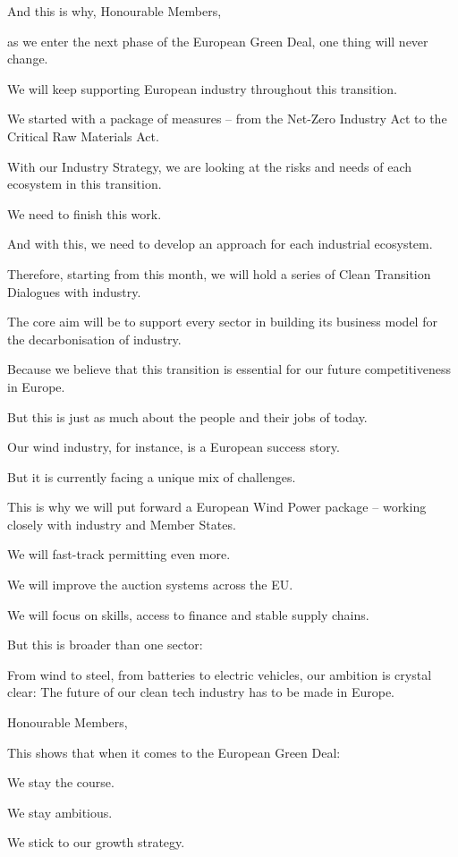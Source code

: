 \documentclass[a4paper,11pt]{article}
\begin{document}
And this is why, Honourable Members,

as we enter the next phase of the European Green Deal, one thing will never change.

We will keep supporting European industry throughout this transition.  

We started with a package of measures – from the Net-Zero Industry Act to the Critical Raw Materials Act. 

With our Industry Strategy, we are looking at the risks and needs of each ecosystem in this transition.

We need to finish this work.

And with this, we need to develop an approach for each industrial ecosystem.

Therefore, starting from this month, we will hold a series of Clean Transition Dialogues with industry.

The core aim will be to support every sector in building its business model for the decarbonisation of industry.

Because we believe that this transition is essential for our future competitiveness in Europe.

But this is just as much about the people and their jobs of today.

Our wind industry, for instance, is a European success story.

But it is currently facing a unique mix of challenges.

This is why we will put forward a European Wind Power package – working closely with industry and Member States.

We will fast-track permitting even more.

We will improve the auction systems across the EU.

We will focus on skills, access to finance and stable supply chains.

But this is broader than one sector:

From wind to steel, from batteries to electric vehicles, our ambition is crystal clear: The future of our clean tech industry has to be made in Europe. 

 

Honourable Members, 

This shows that when it comes to the European Green Deal: 

We stay the course. 

We stay ambitious. 

We stick to our growth strategy. 
\end{document}
